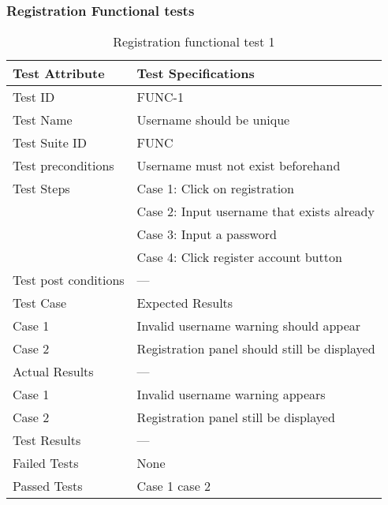 \documentclass{article}
\begin{document}
\subsubsection{Registration Functional tests}
\begin{table}[htbp]
\begin{center}
\begin{tabular}{|l | l|}
\hline
Test Attribute & Test Specifications \\
\hline
Test ID & FUNC-1 \\
\hline
Test Name  & Username should be unique \\
\hline
Test Suite  ID & FUNC \\
\hline
Test preconditions & Username must not exist beforehand \\
\hline
Test Steps & Case 1: Click on registration \\
\hline
  & Case 2: Input username that exists already  \\
\hline
  & Case 3: Input a password  \\
\hline
  & Case 4: Click register account button  \\
\hline
Test post conditions & --- \\
\hline
Test Case & Expected Results\\
\hline
Case 1  &  Invalid username warning should appear  \\
\hline
  Case 2 &  Registration panel should still be displayed  \\
\hline
Actual Results & ---\\
\hline
Case 1  &  Invalid username warning appears  \\
\hline
Case 2 &  Registration panel still be displayed  \\
\hline
Test Results & ---\\
\hline
Failed Tests & None\\
\hline
Passed Tests & Case 1 case 2\\
\hline
\end{tabular}
\end{center}
\caption{Registration functional test 1}
\end{table}
\label{table:2a}
\end{document}
